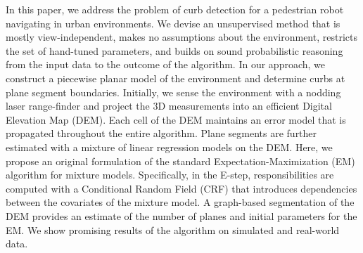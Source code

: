 In this paper, we address the problem of curb detection for a pedestrian robot
navigating in urban environments. We devise an unsupervised method that is
mostly view-independent, makes no assumptions about the environment, restricts
the set of hand-tuned parameters, and builds on sound probabilistic reasoning
from the input data to the outcome of the algorithm. In our approach, we
construct a piecewise planar model of the environment and determine curbs at
plane segment boundaries. Initially, we sense the environment with a nodding
laser range-finder and project the 3D measurements into an efficient Digital
Elevation Map (DEM). Each cell of the DEM maintains an error model that is
propagated throughout the entire algorithm. Plane segments are further estimated
with a mixture of linear regression models on the DEM. Here, we propose an
original formulation of the standard Expectation-Maximization (EM) algorithm for
mixture models. Specifically, in the E-step, responsibilities are computed with
a Conditional Random Field (CRF) that introduces dependencies between the
covariates of the mixture model. A graph-based segmentation of the DEM provides
an estimate of the number of planes and initial parameters for the EM. We show
promising results of the algorithm on simulated and real-world data.
